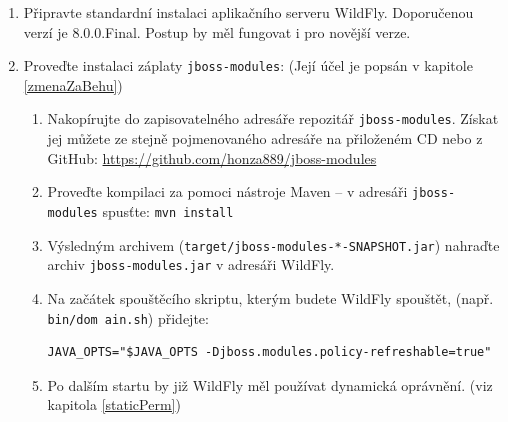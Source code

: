 \begin{enumerate}
  \item Připravte standardní instalaci aplikačního serveru WildFly. Doporučenou verzí je 8.0.0.Final. Postup by měl fungovat i pro novější verze.
  
  \item Proveďte instalaci záplaty {\tt jboss-modules}: (Její účel je popsán v kapitole \ref{zmenaZaBehu})
  \begin{enumerate}
    \item Nakopírujte do zapisovatelného adresáře repozitář {\tt jboss-modules}. Získat jej můžete ze stejně pojmenovaného adresáře na přiloženém CD nebo z GitHub:
      \newline\url{https://github.com/honza889/jboss-modules}
    \item Proveďte kompilaci za pomoci nástroje Maven -- v adresáři {\tt jboss-modules} spusťte: {\tt mvn install}
    \item Výsledným archivem ({\tt target/jboss-modules-*-SNAPSHOT.jar}) nahraďte archiv {\tt jboss-modules.jar} v adresáři WildFly.
    \item Na začátek spouštěcího skriptu, kterým budete WildFly spouštět, (např. {\tt bin/dom ain.sh}) přidejte:
      \begin{lstlisting}
JAVA_OPTS="$JAVA_OPTS -Djboss.modules.policy-refreshable=true"
      \end{lstlisting}
    \item Po dalším startu by již WildFly měl používat dynamická oprávnění. (viz kapitola \ref{staticPerm})
  \end{enumerate}
  

\end{enumerate}
